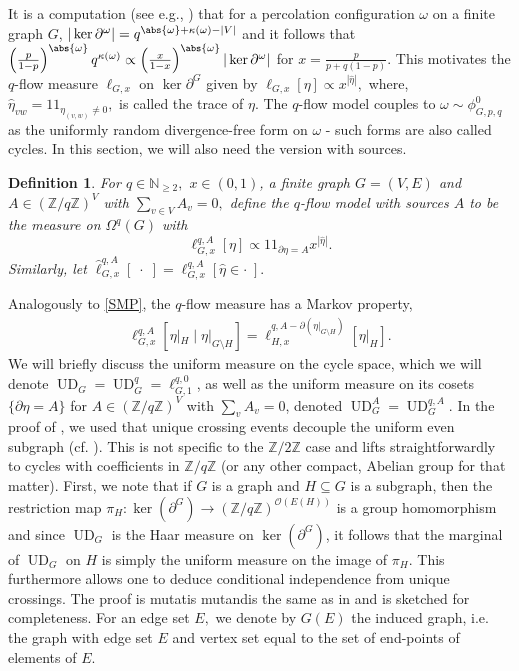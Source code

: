 \documentclass[article,11pt,reqno]{amsart}
\newcommand{\id}{1\! \!1}
\newtheorem{definition}[theorem]{Definition}
\begin{document}
It is a computation (see e.g., \cite[Lemma 4.1]{hansen2025general}) that for a percolation configuration $\omega$ on a finite graph $G$, $|\ker\partial^{\omega}|=q^{\abs{\omega}+\kappa(\omega)-|V|}$ and it follows that $\left(\frac{p}{1-p}\right)^{\abs{\omega}}q^{\kappa(\omega)}\propto \left(\frac{x}{1-x}\right)^{\abs{\omega}}|\ker \partial^{\omega}|$ for $x=\frac{p}{p+q(1-p)}$. This motivates the $q$-flow measure $\ell_{G,x}$ on $\ker \partial^{G}$ given by $\ell_{G,x}[\eta]\propto x^{|\hat{\eta}|},$ where, $\hat{\eta}_{vw}=\id_{\eta_{(v,w)}\neq 0},$ is called the trace of $\eta$. The $q$-flow model couples to $\omega\sim \phi^0_{G,p,q}$ as the uniformly random divergence-free form on $\omega$ - such forms are also called cycles. In this section, we will also need the version with sources.
\begin{definition}
For $q\in \mathbb{N}_{\geq 2},$ $x\in (0,1)$, a finite graph $G=(V,E)$ and $A\in(\mathbb{Z}/q\mathbb{Z})^V$ with $\sum_{v\in V} A_v=0,$  define the $q$-flow model with sources $A$ to be the measure on $\Omega^q(G)$ with 
$$
\ell_{G,x}^{q,A}[\eta]\propto \id_{\partial \eta=A} x^{|\hat{\eta}|}.
$$
Similarly, let $\hat{\ell}^{q,A}_{G,x}[\;\cdot\;]=\ell^{q,A}_{G,x}[\hat{\eta}\in\cdot\;].$ 
\end{definition}
Analogously to \eqref{SMP}, the $q$-flow measure has a Markov property,  
\begin{align}\label{eq:q_flow_Markov}
     \ell^{q,A}_{G,x}[\eta|_H\mid \eta|_{G\setminus H}]=\ell_{H,x}^{q,A-\partial (\eta|_{G\setminus H})}[\eta|_H].
\end{align}
We will briefly discuss the uniform measure on the cycle space, which we will denote $\operatorname{UD}_G=\operatorname{UD}^q_G=\ell^{q,0}_{G,1}$, as well as the uniform measure on its cosets $\{\partial \eta=A\}$ for $A\in (\mathbb{Z}/q\mathbb{Z})^V$ with $\sum_vA_v=0$, denoted $\operatorname{UD}^A_G=\operatorname{UD}^{q,A}_G$. 
In the proof of , we used that unique crossing events decouple the uniform even subgraph (cf. \cite[Proposition 3.6]{hansen2023uniform}). This is not specific to the $\mathbb{Z}/2\mathbb{Z}$ case and lifts straightforwardly to cycles with coefficients in $\mathbb{Z}/q\mathbb{Z}$ (or any other compact, Abelian group for that matter). First, we note that if $G$ is a graph and $H\subseteq G$ is a subgraph, then the restriction map $\pi_H:\ker(\partial^{G})\to (\mathbb{Z}/q\mathbb{Z})^{\mathcal{O}(E(H))}$ is a group homomorphism and since $\operatorname{UD}_G$ is the Haar measure on $\ker(\partial^G)$, it follows that the marginal of $\operatorname{UD}_G$ on $H$ is simply the uniform measure on the image of $\pi_H$. This furthermore allows one to deduce conditional independence from unique crossings. The proof is mutatis mutandis the same as in \cite[Proposition 3.6]{hansen2023uniform} and is sketched for completeness. For an edge set $E,$ we denote by $G(E)$ the induced graph, i.e. the graph with edge set $E$ and vertex set equal to the set of end-points of elements of $E$.
\end{document}
